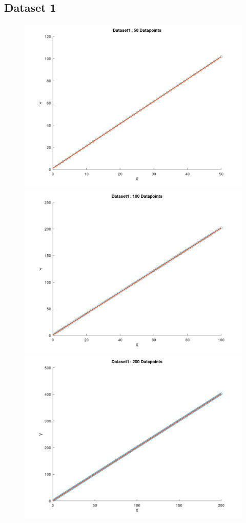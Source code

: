 \documentclass{article}
\begin{document}
\subsection{Dataset 1}
\begin{figure} [!ht]
	\includegraphics[width=.55\textwidth]{D1-50.png}\hfill
	\includegraphics[width=.55\textwidth]{D1-100.png}\hfill
	\includegraphics[width=1\textwidth]{D1-200.png}
	\label{fig:plots1}
\end{figure}
\pagebreak
\end{document}
